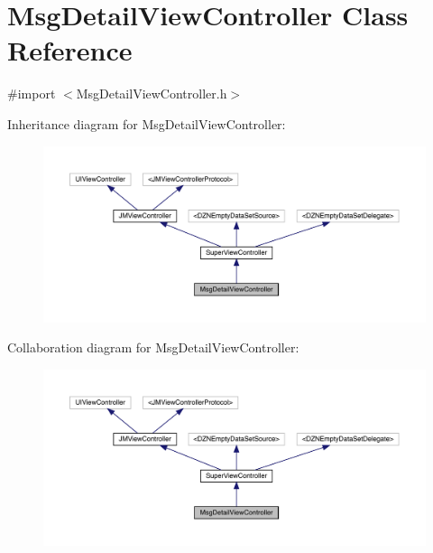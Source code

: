 \hypertarget{interface_msg_detail_view_controller}{}\section{Msg\+Detail\+View\+Controller Class Reference}
\label{interface_msg_detail_view_controller}


{\ttfamily \#import $<$Msg\+Detail\+View\+Controller.\+h$>$}



Inheritance diagram for Msg\+Detail\+View\+Controller\+:\nopagebreak
\begin{figure}[H]
\begin{center}
\leavevmode
\includegraphics[width=350pt]{interface_msg_detail_view_controller__inherit__graph}
\end{center}
\end{figure}


Collaboration diagram for Msg\+Detail\+View\+Controller\+:\nopagebreak
\begin{figure}[H]
\begin{center}
\leavevmode
\includegraphics[width=350pt]{interface_msg_detail_view_controller__coll__graph}
\end{center}
\end{figure}
